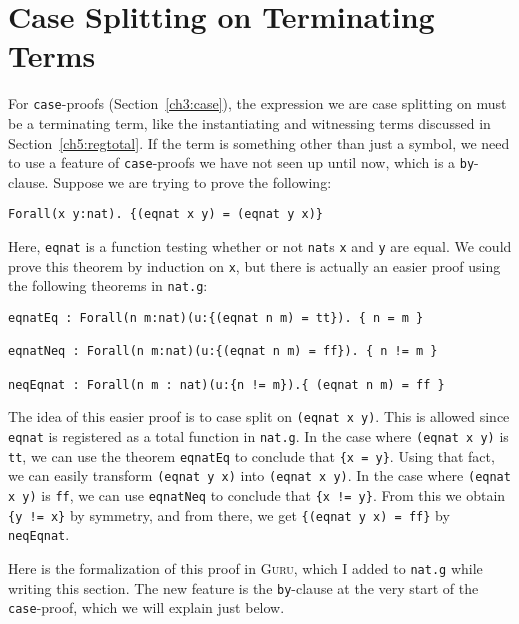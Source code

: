 \documentclass{book}[12pt]
\newcommand{\guru}[0]{\textsc{Guru}\xspace}
\begin{document}
\section{Case Splitting on Terminating Terms}
\label{ch5:case}

For \texttt{case}-proofs (Section~\ref{ch3:case}), the expression we
are case splitting on must be a terminating term, like the
instantiating and witnessing terms discussed in
Section~\ref{ch5:regtotal}.  If the term is something other than just
a symbol, we need to use a feature of \texttt{case}-proofs we have not
seen up until now, which is a \texttt{by}-clause.  Suppose we are
trying to prove the following:

\begin{verbatim}
Forall(x y:nat). {(eqnat x y) = (eqnat y x)}
\end{verbatim}

\noindent Here, \texttt{eqnat} is a function testing whether or not
\texttt{nat}s \texttt{x} and \texttt{y} are equal.  We could prove
this theorem by induction on \texttt{x}, but there is actually an
easier proof using the following theorems in \texttt{nat.g}:

\begin{verbatim}
eqnatEq : Forall(n m:nat)(u:{(eqnat n m) = tt}). { n = m }

eqnatNeq : Forall(n m:nat)(u:{(eqnat n m) = ff}). { n != m } 

neqEqnat : Forall(n m : nat)(u:{n != m}).{ (eqnat n m) = ff } 
\end{verbatim}

\noindent The idea of this easier proof is to case split on
\texttt{(eqnat x y)}.  This is allowed since \texttt{eqnat} is
registered as a total function in \texttt{nat.g}.  In the case where
\texttt{(eqnat x y)} is \texttt{tt}, we can use the theorem
\texttt{eqnatEq} to conclude that \texttt{\{x = y\}}.  Using that
fact, we can easily transform \texttt{(eqnat y x)} into \texttt{(eqnat
x y)}.  In the case where \texttt{(eqnat x y)} is \texttt{ff}, we can
use \texttt{eqnatNeq} to conclude that \texttt{\{x != y\}}.  From this
we obtain \texttt{\{y != x\}} by symmetry, and from there, we get
\texttt{\{(eqnat y x) = ff\}} by \texttt{neqEqnat}.

Here is the formalization of this proof in \guru, which I added to
\texttt{nat.g} while writing this section.  The new feature is the
\texttt{by}-clause at the very start of the \texttt{case}-proof, which
we will explain just below.
\end{document}
